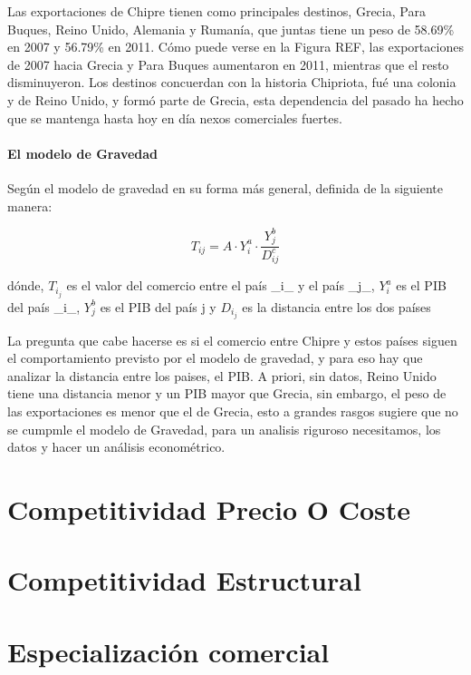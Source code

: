 \documentclass[a4paper,openright,12pt]{book}
\begin{document}
Las exportaciones de Chipre tienen como principales destinos, Grecia, Para Buques, Reino Unido, Alemania y Rumanía, que juntas tiene un peso de 58.69\% en 2007 y 56.79\% en 2011. Cómo puede verse en la Figura REF, las exportaciones de 2007 hacia Grecia y Para Buques aumentaron en 2011, mientras que el resto disminuyeron.
Los destinos concuerdan con la historia Chipriota, fué una colonia y de Reino Unido, y formó parte de Grecia, esta dependencia del pasado ha hecho que se mantenga hasta hoy en día nexos comerciales fuertes.

\subsubsection{El modelo de Gravedad}

Según el modelo de gravedad en su forma más general, definida de la siguiente manera:

\begin{equation}
T_{ij} = A \cdot Y_i^a \cdot \frac{Y_j^b}{D_{ij}^c}
\end{equation}

dónde, $T_i_j$ es el valor del comercio entre el país _i_ y el país _j_, $Y_i^a$ es el PIB del país _i_, $Y_j^b$ es el PIB del país j y $D_i_j$ es la distancia entre los dos países

La pregunta que cabe hacerse es si el comercio entre Chipre y estos países siguen el comportamiento previsto por el modelo de gravedad, y para eso hay que analizar la distancia entre los paises, el PIB. A priori, sin datos, Reino Unido tiene una distancia menor y un PIB mayor que Grecia, sin embargo, el peso de las exportaciones es menor que el de Grecia, esto a grandes rasgos sugiere que no se cumpmle el modelo de Gravedad, para un analisis riguroso necesitamos, los datos y hacer un análisis econométrico.

\chapter{Competitividad Precio O Coste}
\label{cap4}

\chapter{Competitividad Estructural}
\label{cap5}

\chapter{Especialización comercial}
\label{cap6}
\end{document}

